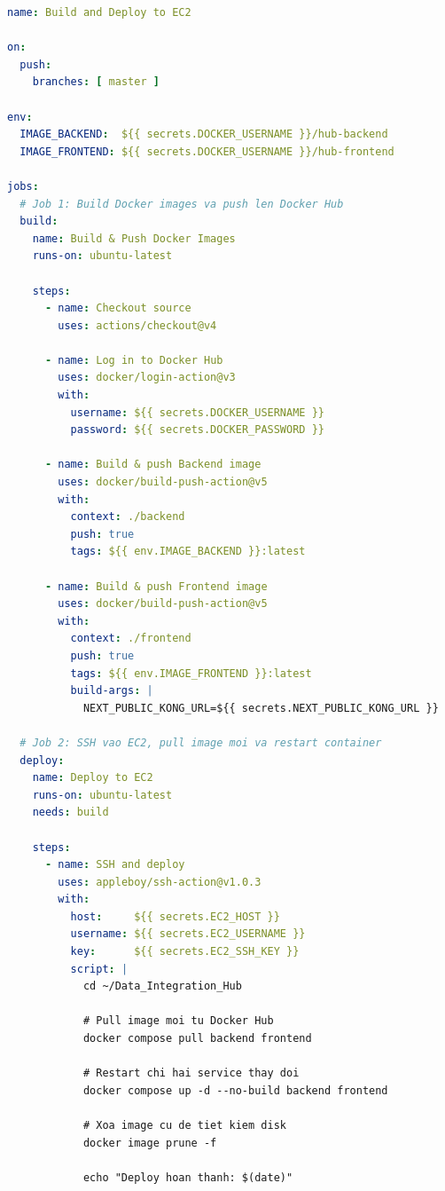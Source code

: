 \begin{lstlisting}[language=yaml,
                   caption={.github/workflows/deploy.yml},
                   label={lst:cicd-workflow}]
name: Build and Deploy to EC2

on:
  push:
    branches: [ master ]

env:
  IMAGE_BACKEND:  ${{ secrets.DOCKER_USERNAME }}/hub-backend
  IMAGE_FRONTEND: ${{ secrets.DOCKER_USERNAME }}/hub-frontend

jobs:
  # Job 1: Build Docker images va push len Docker Hub
  build:
    name: Build & Push Docker Images
    runs-on: ubuntu-latest

    steps:
      - name: Checkout source
        uses: actions/checkout@v4

      - name: Log in to Docker Hub
        uses: docker/login-action@v3
        with:
          username: ${{ secrets.DOCKER_USERNAME }}
          password: ${{ secrets.DOCKER_PASSWORD }}

      - name: Build & push Backend image
        uses: docker/build-push-action@v5
        with:
          context: ./backend
          push: true
          tags: ${{ env.IMAGE_BACKEND }}:latest

      - name: Build & push Frontend image
        uses: docker/build-push-action@v5
        with:
          context: ./frontend
          push: true
          tags: ${{ env.IMAGE_FRONTEND }}:latest
          build-args: |
            NEXT_PUBLIC_KONG_URL=${{ secrets.NEXT_PUBLIC_KONG_URL }}

  # Job 2: SSH vao EC2, pull image moi va restart container
  deploy:
    name: Deploy to EC2
    runs-on: ubuntu-latest
    needs: build

    steps:
      - name: SSH and deploy
        uses: appleboy/ssh-action@v1.0.3
        with:
          host:     ${{ secrets.EC2_HOST }}
          username: ${{ secrets.EC2_USERNAME }}
          key:      ${{ secrets.EC2_SSH_KEY }}
          script: |
            cd ~/Data_Integration_Hub

            # Pull image moi tu Docker Hub
            docker compose pull backend frontend

            # Restart chi hai service thay doi
            docker compose up -d --no-build backend frontend

            # Xoa image cu de tiet kiem disk
            docker image prune -f

            echo "Deploy hoan thanh: $(date)"
\end{lstlisting}

